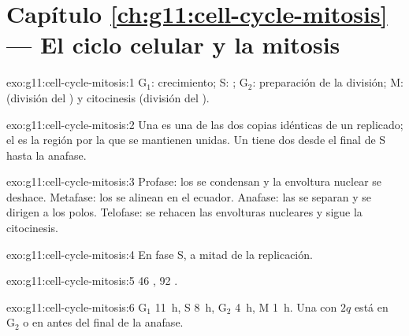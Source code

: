 \section*{Capítulo \ref{ch:g11:cell-cycle-mitosis} --- El ciclo celular y la mitosis}

\begin{solution}{exo:g11:cell-cycle-mitosis:1}
$\mathrm{G_1}$: crecimiento; S: ; $\mathrm{G_2}$:
preparación de la división; M:  (división del ) y
citocinesis (división del ).
\end{solution}

\begin{solution}{exo:g11:cell-cycle-mitosis:2}
Una  es una de las dos copias idénticas de un 
replicado; el  es la región por la que se mantienen unidas.
Un  tiene dos  desde el final de S hasta la anafase.
\end{solution}

\begin{solution}{exo:g11:cell-cycle-mitosis:3}
Profase: los  se condensan y la envoltura nuclear se
deshace. Metafase: los  se alinean en el ecuador. Anafase:
las  se separan y se dirigen a los polos. Telofase: se
rehacen las envolturas nucleares y sigue la citocinesis.
\end{solution}

\begin{solution}{exo:g11:cell-cycle-mitosis:4}
En fase S, a mitad de la replicación.
\end{solution}

\begin{solution}{exo:g11:cell-cycle-mitosis:5}
46 , 92 .
\end{solution}

\begin{solution}{exo:g11:cell-cycle-mitosis:6}
$\mathrm{G_1}$ \qty{11}{h}, S \qty{8}{h}, $\mathrm{G_2}$ \qty{4}{h}, M
\qty{1}{h}. Una  con $2q$ está en $\mathrm{G_2}$ o en 
antes del final de la anafase.
\end{solution}


